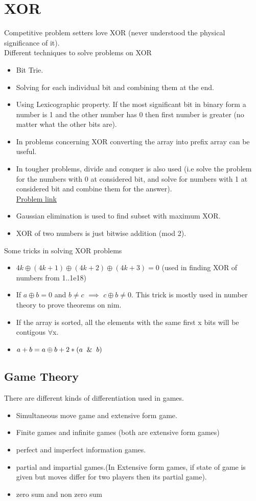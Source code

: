 \documentclass[../Notes.tex]{subfiles}
\begin{document}
\chapter{XOR}
Competitive problem setters love XOR (never understood the physical significance of it).\\

Different techniques to solve problems on XOR
\begin{itemize}
	\item Bit Trie.
	\item Solving for each individual bit and combining them at the end.
	\item Using Lexicographic property. If the most significant bit in binary form a number is 1 and the other number has 0 then first number is greater (no matter what the other bits are).
	\item In problems concerning XOR converting the array into prefix array can be useful.
	\item In tougher problems, divide and conquer is also used (i.e solve the problem for the numbers with 0 at considered bit, and solve for numbers with 1 at considered bit and combine them for the answer).\\
	\href{https://www.codechef.com/MARCH12/problems/XOR/}{Problem link}
	\item Gaussian elimination is used to find subset with maximum XOR.
	\item XOR of two numbers is just bitwise addition (mod 2).
\end{itemize}

Some tricks in solving XOR problems
\begin{itemize}
	\item $4k\oplus(4k+1)\oplus(4k+2)\oplus(4k+3)=0$ (used in finding XOR of numbers from 1..1e18)
	\item If $a\oplus b=0$ and $b\neq c$ $\implies$ $c\oplus b\neq0$. This trick is mostly used in number theory to prove theorems on nim.
	\item If the array is sorted, all the elements with the same first x bits will be contigous $\forall$x.
	\item $a+b=a\oplus b + 2*(a\And b)$
\end{itemize}

\section{Game Theory}
There are different kinds of differentiation used in games.
\begin{itemize}
	\item Simultaneous move game and extensive form game.
	\item Finite games and infinite games (both are extensive form games)
	\item perfect and imperfect information games.
	\item partial and impartial games.(In Extensive form games, if state of game is given but moves differ for two players then its partial game).
	\item zero sum and non zero sum
\end{itemize}
\end{document}

